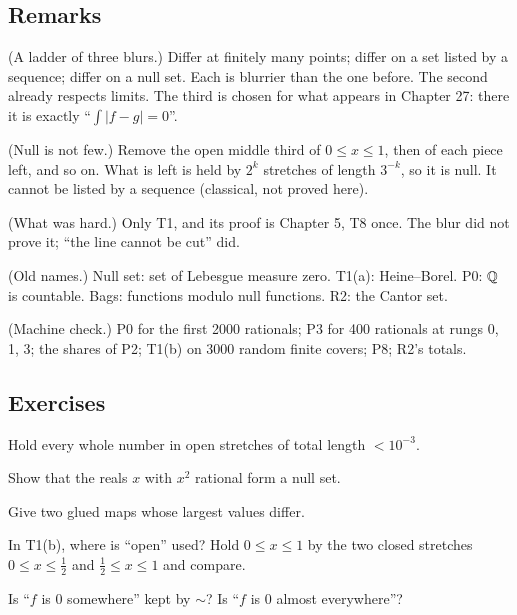 \subsection*{Remarks}

\begin{lines}
\item[\lab{R1}] (A ladder of three blurs.) Differ at finitely many points; differ on a set listed by a sequence; differ on a null set. Each is blurrier than the one before. The second already respects limits. The third is chosen for what appears in Chapter 27: there it is exactly ``$\int |f - g| = 0$''.
\item[\lab{R2}] (Null is not few.) Remove the open middle third of $0 \le x \le 1$, then of each piece left, and so on. What is left is held by $2^k$ stretches of length $3^{-k}$, so it is null. It cannot be listed by a sequence (classical, not proved here).
\item[\lab{R3}] (What was hard.) Only T1, and its proof is Chapter 5, T8 once. The blur did not prove it; ``the line cannot be cut'' did.
\item[\lab{R4}] (Old names.) Null set: set of Lebesgue measure zero. T1(a): Heine--Borel. P0: $\mathbb{Q}$ is countable. Bags: functions modulo null functions. R2: the Cantor set.
\item[\lab{R5}] (Machine check.) P0 for the first 2000 rationals; P3 for 400 rationals at rungs 0, 1, 3; the shares of P2; T1(b) on 3000 random finite covers; P8; R2's totals.
\end{lines}

\subsection*{Exercises}

\begin{lines}
\item[\lab{E1}] Hold every whole number in open stretches of total length $< 10^{-3}$.
\item[\lab{E2}] Show that the reals $x$ with $x^2$ rational form a null set.
\item[\lab{E3}] Give two glued maps whose largest values differ.
\item[\lab{E4}] In T1(b), where is ``open'' used? Hold $0 \le x \le 1$ by the two closed stretches $0 \le x \le \tfrac12$ and $\tfrac12 \le x \le 1$ and compare.
\item[\lab{E5}] Is ``$f$ is $0$ somewhere'' kept by $\sim$? Is ``$f$ is $0$ almost everywhere''?
\end{lines}

